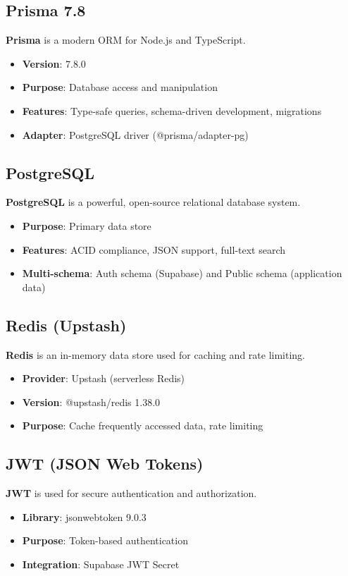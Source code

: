 \documentclass[12pt,a4paper]{report}
\begin{document}
\subsection{Prisma 7.8}
\textbf{Prisma} is a modern ORM for Node.js and TypeScript.
\begin{itemize}
    \item \textbf{Version}: 7.8.0
    \item \textbf{Purpose}: Database access and manipulation
    \item \textbf{Features}: Type-safe queries, schema-driven development, migrations
    \item \textbf{Adapter}: PostgreSQL driver (@prisma/adapter-pg)
\end{itemize}

\subsection{PostgreSQL}
\textbf{PostgreSQL} is a powerful, open-source relational database system.
\begin{itemize}
    \item \textbf{Purpose}: Primary data store
    \item \textbf{Features}: ACID compliance, JSON support, full-text search
    \item \textbf{Multi-schema}: Auth schema (Supabase) and Public schema (application data)
\end{itemize}

\subsection{Redis (Upstash)}
\textbf{Redis} is an in-memory data store used for caching and rate limiting.
\begin{itemize}
    \item \textbf{Provider}: Upstash (serverless Redis)
    \item \textbf{Version}: @upstash/redis 1.38.0
    \item \textbf{Purpose}: Cache frequently accessed data, rate limiting
\end{itemize}

\subsection{JWT (JSON Web Tokens)}
\textbf{JWT} is used for secure authentication and authorization.
\begin{itemize}
    \item \textbf{Library}: jsonwebtoken 9.0.3
    \item \textbf{Purpose}: Token-based authentication
    \item \textbf{Integration}: Supabase JWT Secret
\end{itemize}
\end{document}
